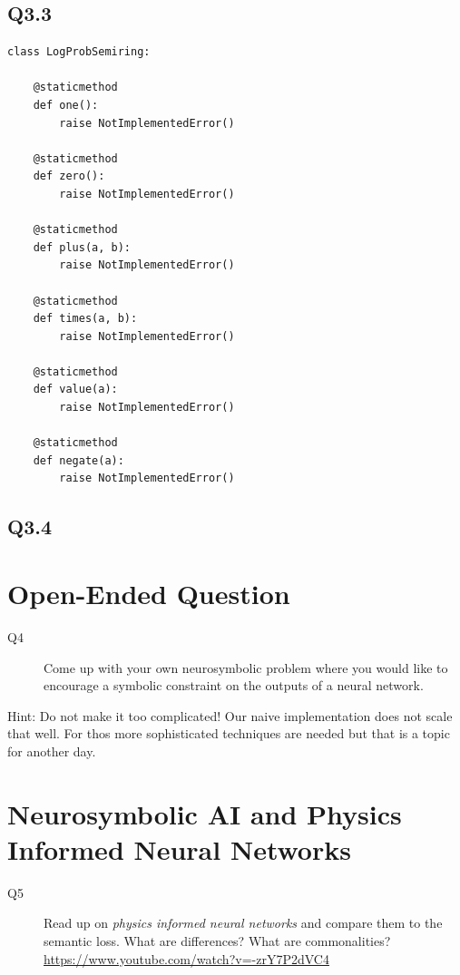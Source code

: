 \documentclass{article}
\begin{document}
\subsection*{Q3.3}

\begin{verbatim}
class LogProbSemiring:

	@staticmethod
	def one():
		raise NotImplementedError()

	@staticmethod
	def zero():
		raise NotImplementedError()

	@staticmethod
	def plus(a, b):
		raise NotImplementedError()

	@staticmethod
	def times(a, b):
		raise NotImplementedError()

	@staticmethod
	def value(a):
		raise NotImplementedError()

	@staticmethod
	def negate(a):
		raise NotImplementedError()
	\end{verbatim}


\subsection*{Q3.4}








\section{Open-Ended Question}

\begin{description}
	\item[Q4] Come up with your own neurosymbolic problem where you would like to encourage a symbolic constraint on the outputs of a neural network.
\end{description}

Hint: Do not make it too complicated! Our naive implementation does not scale that well. For thos more sophisticated techniques are needed \citep{maene2025klay} but that is a topic for another day.


\section{Neurosymbolic AI and Physics Informed Neural Networks}

\begin{description}
	\item[Q5] Read up on \textit{physics informed neural networks} \citep{raissi2019physics} and compare them to the semantic loss. What are differences? What are commonalities?
	      \\
	      \href{https://www.youtube.com/watch?v=-zrY7P2dVC4}{https://www.youtube.com/watch?v=-zrY7P2dVC4}
\end{description}






\printbibliography
\end{document}
